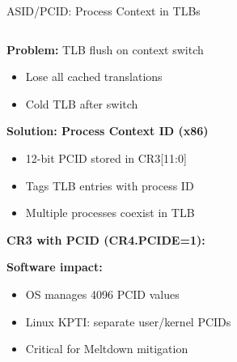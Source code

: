 \documentclass[aspectratio=169,12pt]{beamer}
\begin{document}
\begin{frame}{ASID/PCID: Process Context in TLBs}
\begin{columns}[T]
\begin{column}{0.48\textwidth}
\textbf{Problem:} TLB flush on context switch
\begin{itemize}
\item Lose all cached translations
\item Cold TLB after switch
\end{itemize}

\textbf{Solution: Process Context ID (x86)}
\begin{itemize}
\item 12-bit PCID stored in CR3[11:0]
\item Tags TLB entries with process ID
\item Multiple processes coexist in TLB
\end{itemize}

\textbf{CR3 with PCID (CR4.PCIDE=1):}
\begin{center}
\end{center}

\textbf{Software impact:}
\begin{itemize}
\item OS manages 4096 PCID values
\item Linux KPTI: separate user/kernel PCIDs
\item Critical for Meltdown mitigation
\end{itemize}
\end{column}


\end{columns}
\end{frame}
\end{document}
